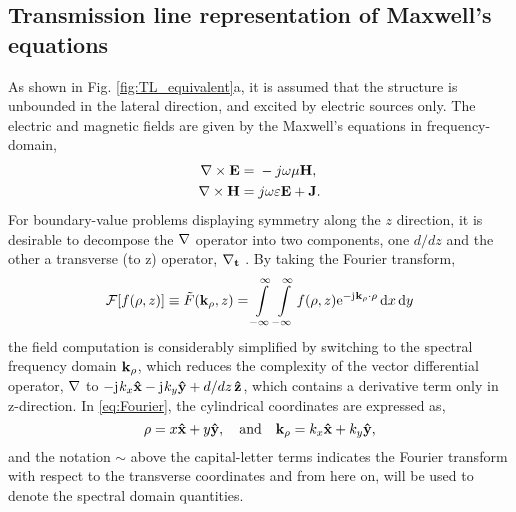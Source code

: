 \documentclass[12pt]{article}
\begin{document}
\subsection{Transmission line representation of Maxwell's equations}
%
As shown in Fig. \ref{fig:TL_equivalent}a, it is assumed that the structure is unbounded in the lateral direction, and excited by electric sources only. The electric and magnetic fields are given by the Maxwell's equations in frequency-domain,
%
\begin{subequations}
\begin{align}
\nabla \times{\mathbf{E}} ={}& -j \omega \mu \mathbf{H},
\label{eq:E}\\
\nabla \times{\mathbf{H}} ={}& j \omega \varepsilon \mathbf{E} + \mathbf{J}.
\label{eq:H}
\end{align}
\label{eq:MaxE}%
\end{subequations}
%
For boundary-value problems displaying symmetry along the $z$ direction, it is desirable to decompose the $\mathbf{\nabla}$ operator into two components, one $d/dz$ and the other a transverse (to z) operator, $\mathbf{\nabla_t}$ \cite[p. 64]{felsen1994}. By taking the Fourier transform,
%
\begin{equation}
\mathcal{F}[f(\mathbf{\rho},z)] \equiv \tilde{F}(\mathbf{k}_{\rho},z) = \int\limits_{-\infty}^\infty \int\limits_{-\infty}^\infty
f(\mathbf{\rho},z) \mathrm{e}^{-\mathrm{j}\mkern1mu \mathbf{k}_{\rho} \cdot \mathbf{\rho}} \mathop{}\!\mathrm{d}{x} \mathop{}\!\mathrm{d}{y}
\label{eq:Fourier}
\end{equation}
%
the field computation is considerably simplified by switching to the spectral frequency domain $\mathbf{k_{\rho}}$, which reduces the complexity of the vector differential operator, $\mathbf{\nabla}$ to $-\mathrm{j}\mkern1mu k_x \mathbf{\hat{x}} - \mathrm{j}\mkern1mu k_y \mathbf{\hat{y}} + d/dz\, \mathbf{\hat{z}}$, which contains a derivative term only in z-direction. In \eqref{eq:Fourier}, the cylindrical coordinates are expressed as,
%
\begin{equation}
\mathbf{\rho} = x\mathbf{\hat{x}} + y\mathbf{\hat{y}}, \quad \text{and} \quad
\mathbf{k_{\rho}} = k_x\mathbf{\hat{x}} + k_y\mathbf{\hat{y}},
\label{eq:rect2cylindrical}
\end{equation}
%
and the notation $\sim$ above the capital-letter terms indicates the Fourier transform with respect to the transverse coordinates and from here on, will be used to denote the spectral domain quantities.
\end{document}
